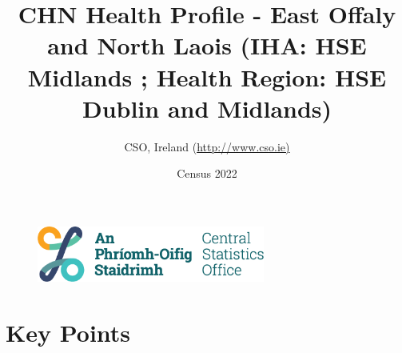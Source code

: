 \documentclass{article}
\title{CHN Health Profile - East Offaly and North Laois (IHA: HSE Midlands ;  Health Region: HSE Dublin and Midlands) }
\date{Census 2022}
\author{CSO, Ireland  (\url{http://www.cso.ie)}}
\begin{document}


\begin{figure}
	\centering
\includegraphics[width =75mm]{../figures/CSO_Logo.png}
\end{figure}

				 
		   
						  
														  
																																													
												 
			 
\maketitle
					
													   
				 
						 
																																																																											   
				 
				  
  \pagebreak
    	    \tableofcontents

\pagebreak


\section{Key Points}
\end{document}
